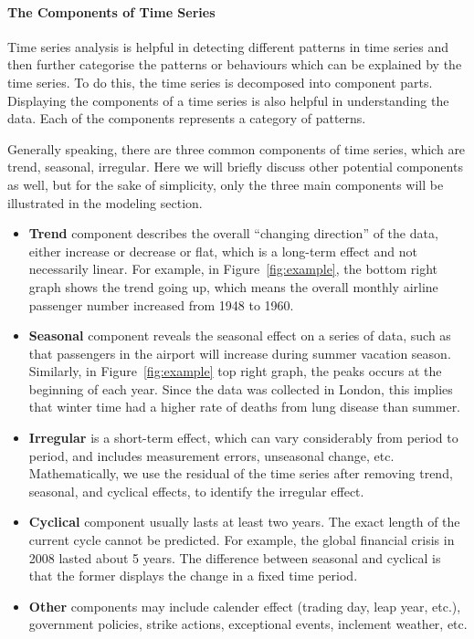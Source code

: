 \paragraph{The Components of Time Series}
Time series analysis is helpful in detecting different patterns in time series and then further categorise the patterns or behaviours which can be explained by the time series. To do this, the time series is decomposed into component parts. Displaying the components of a time series is also helpful in understanding the data. Each of the components represents a category of patterns.

Generally speaking, there are three common components of time series, which are trend, seasonal, irregular. Here we will briefly discuss other potential components as well, but for the sake of simplicity, only the three main components will be illustrated in the modeling section. 
 \begin{itemize}[noitemsep]
    \item \textbf{Trend} component describes the overall ``changing direction'' of the data, either increase or decrease or flat, which is a long-term effect and not necessarily linear. For example, in Figure~\ref{fig:example}, the bottom right graph shows the trend going up, which means the overall monthly airline passenger number increased from 1948 to 1960.
    \item \textbf{Seasonal} component reveals the seasonal effect on a series of data, such as that passengers in the airport will increase during summer vacation season. Similarly, in Figure~\ref{fig:example} top right graph, the peaks occurs at the beginning of each year. Since the data was collected in London, this implies that winter time had a higher rate of deaths from lung disease than summer. 
    \item \textbf{Irregular} is a short-term effect, which can vary considerably from period to period, and includes measurement errors, unseasonal change, etc. Mathematically, we use the residual of the time series after removing trend, seasonal, and cyclical effects, to identify the irregular effect.
    \item \textbf{Cyclical} component usually lasts at least two years. The exact length of the current cycle cannot be predicted. For example, the global financial crisis in 2008 lasted about 5 years. The difference between seasonal and cyclical is that the former displays the change in a fixed time period. 
    \item \textbf{Other} components may include calender effect (trading day, leap year, etc.), government policies, strike actions, exceptional events, inclement weather, etc.
\end{itemize}
